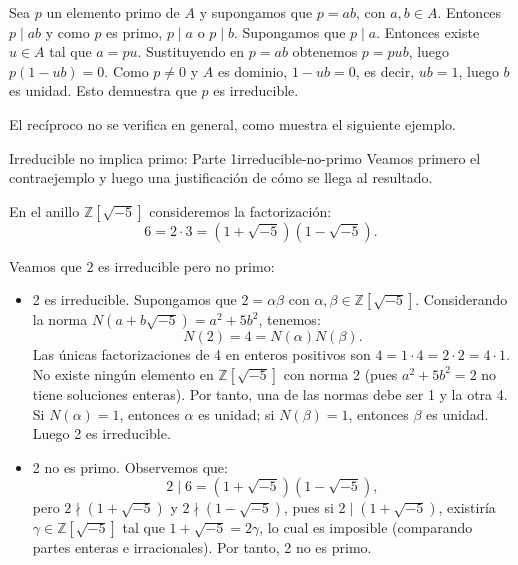\begin{proofbox}
Sea \(p\) un elemento primo de \(A\) y supongamos que \(p = ab\), con \(a, b \in A\). Entonces \(p \mid ab\) y como \(p\) es primo, \(p \mid a\) o \(p \mid b\). Supongamos que \(p \mid a\). Entonces existe \(u \in A\) tal que \(a = pu\). Sustituyendo en \(p = ab\) obtenemos \(p = pub\), luego \(p(1 - ub) = 0\). Como \(p \neq 0\) y \(A\) es dominio, \(1 - ub = 0\), es decir, \(ub = 1\), luego \(b\) es unidad. Esto demuestra que \(p\) es irreducible.
\end{proofbox}

El recíproco no se verifica en general, como muestra el siguiente ejemplo.

\begin{example}{Irreducible no implica primo: Parte 1}{irreducible-no-primo}
Veamos primero el contraejemplo y luego una justificación de cómo se llega al resultado.

En el anillo \(\mathbb{Z}[\sqrt{-5}]\) consideremos la factorización:
\[
6 = 2 \cdot 3 = (1 + \sqrt{-5})(1 - \sqrt{-5}).
\]

Veamos que \(2\) es irreducible pero no primo:
\begin{itemize}
\item 2 es irreducible. Supongamos que \(2 = \alpha\beta\) con \(\alpha, \beta \in \mathbb{Z}[\sqrt{-5}]\). Considerando la norma \(N(a + b\sqrt{-5}) = a^2 + 5b^2\), tenemos:
\[
N(2) = 4 = N(\alpha)N(\beta).
\]
Las únicas factorizaciones de 4 en enteros positivos son \(4 = 1 \cdot 4 = 2 \cdot 2 = 4 \cdot 1\). No existe ningún elemento en \(\mathbb{Z}[\sqrt{-5}]\) con norma 2 (pues \(a^2 + 5b^2 = 2\) no tiene soluciones enteras). Por tanto, una de las normas debe ser 1 y la otra 4. Si \(N(\alpha) = 1\), entonces \(\alpha\) es unidad; si \(N(\beta) = 1\), entonces \(\beta\) es unidad. Luego 2 es irreducible.

\item 2 no es primo. Observemos que:
\[
2 \mid 6 = (1 + \sqrt{-5})(1 - \sqrt{-5}),
\]
pero \(2 \nmid (1 + \sqrt{-5})\) y \(2 \nmid (1 - \sqrt{-5})\), pues si \(2 \mid (1 + \sqrt{-5})\), existiría \(\gamma \in \mathbb{Z}[\sqrt{-5}]\) tal que \(1 + \sqrt{-5} = 2\gamma\), lo cual es imposible (comparando partes enteras e irracionales). Por tanto, 2 no es primo.
\end{itemize}

\end{example}


